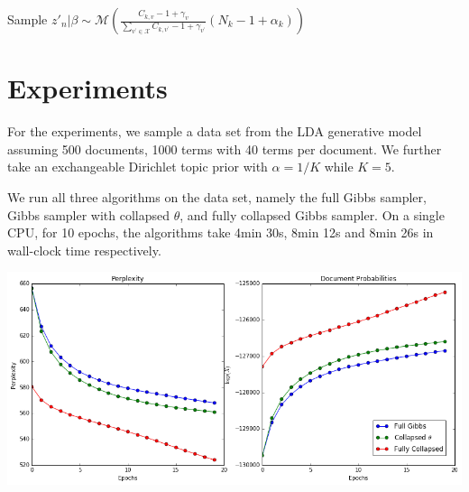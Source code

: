 \documentclass[a0,portrait]{a0poster}
\begin{document}
\begin{multicols}{2}
\begin{minipage}{\linewidth}
	\label{alg:collapsed}
	\begin{algorithmic}[1]
		\State Sample $z'_n | \beta \sim \mathcal{M}(\frac{C_{k,v}  -1 + \gamma_{v}}{\sum_{ v^{\prime} \in \mathcal{X}}C_{k,v^{\prime}} - 1 + \gamma_{v^{\prime}}} (N_k - 1 + \alpha_k))$ 
		\EndFor
		\EndFor
		\EndFor
		\EndFunction
	\end{algorithmic}
\end{minipage}

\section{Experiments}

For the experiments, we sample a data set from the LDA generative model assuming 500 documents, 1000 terms with 40 terms per document. We further take an exchangeable Dirichlet topic prior with $\alpha = 1/K$ while $K = 5$. 

We run all three algorithms on the data set, namely the full Gibbs sampler, Gibbs sampler with collapsed $\theta$, and fully collapsed Gibbs sampler. On a single CPU, for 10 epochs, the algorithms take 4min 30s, 8min 12s and 8min 26s in wall-clock time respectively.

\vspace{2cm}
\begin{minipage}{\linewidth}
	\centering
	\label{fig:results}
	\includegraphics{results2}
\end{minipage}






\end{multicols}
\end{document}

